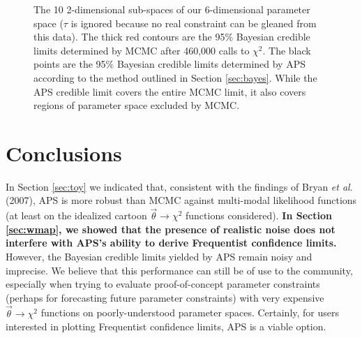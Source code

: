\documentclass[useAMS,usenatbib]{aastex}
\begin{document}
\begin{figure*}
\caption{
The 10 2-dimensional sub-spaces of our 6-dimensional parameter space
($\tau$ is ignored because no real constraint can be gleaned from this data).
The thick red contours are the 95\% Bayesian credible limits determined by MCMC after
460,000 calls to $\chi^2$.  The black points are the 95\% Bayesian credible limits determined
by APS according to the method outlined in Section \ref{sec:bayes}.  While the APS credible limit
covers the entire MCMC limit, it also covers regions of parameter space excluded by MCMC.
}
\label{fig:contours_bayes}
\end{figure*}

\section{Conclusions}
\label{sec:conclusions}

In Section \ref{sec:toy} we indicated that, consistent with the findings
of Bryan {\it et al}. (2007), APS is more robust
than MCMC against multi-modal likelihood functions (at least on the idealized
cartoon $\vec{\theta}\rightarrow\chi^2$ functions considered).
{\bf %
In Section \ref{sec:wmap}, we showed that the presence of realistic noise
does not interfere with APS's ability to derive Frequentist confidence limits.
}%
However, the Bayesian credible
limits yielded by APS remain noisy and imprecise.  We believe that this performance
can still be of use to the community, especially when trying to evaluate proof-of-concept
parameter constraints (perhaps for forecasting future parameter constraints)
with very expensive $\vec{\theta}\rightarrow\chi^2$ functions on poorly-understood
parameter spaces.  Certainly, for users interested in plotting Frequentist confidence 
limits, APS is a viable option.
\end{document}

